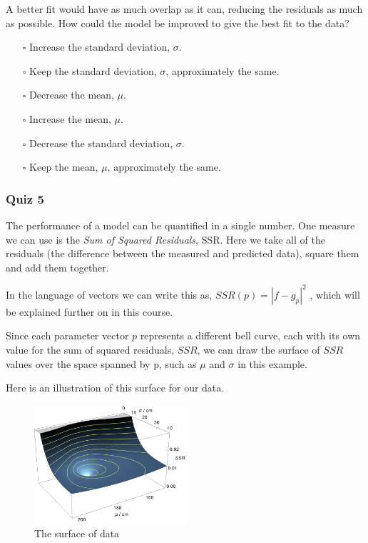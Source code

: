 \documentclass[]{article}
\begin{document}
A better fit would have as much overlap as it can, reducing the residuals as much as possible. How could the model be improved to give the best fit to the data?

\begin{itemize}
	\item[$\square$] Increase the standard deviation, $ \sigma $.
	\item[$\square$] Keep the standard deviation, $ \sigma $, approximately the same.
	\item[$\square$] Decrease the mean, $ \mu $.
	\item[$\square$] Increase the mean, $ \mu $.
	\item[$\square$] Decrease the standard deviation, $ \sigma $.
	\item[$\square$] Keep the mean, $ \mu $, approximately the same.
\end{itemize}

\subsubsection{Quiz 5}

The performance of a model can be quantified in a single number. One measure we can use is the \textit{Sum of Squared Residuals}, SSR. Here we take all of the residuals (the difference between the measured and predicted data), square them and add them together.

In the language of vectors we can write this as, $ SSR(p)=|f-g_p|^2 $ , which will be explained further on in this course.

Since each parameter vector $ p $ represents a different bell curve, each with its own value for the sum of squared residuals, $ SSR $, we can draw the surface of $ SSR $ values over the space spanned by p, such as $ \mu $ and $ \sigma $ in this example.

Here is an illustration of this surface for our data.

\begin{figure}[h]
	\centering
	\includegraphics[width=0.5\textwidth]{quiz5_a}
	\caption{The surface of data}
	\label{fig:quiz5_a}
\end{figure}
\end{document}
